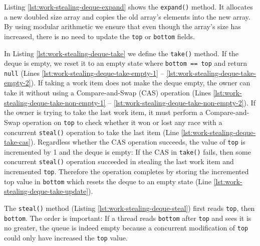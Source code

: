 

Listing \ref{lst:work-stealing-deque-expand} shows the
\lstinline!expand()! method. It allocates a new doubled size array and
copies the old array's elements into the new array. By using modular
arithmetic we ensure that even though the array's size has increased,
there is no need to update the \lstinline!top! or \lstinline!bottom!
fields.



In Listing \ref{lst:work-stealing-deque-take} we define the
\lstinline!take()! method. If the deque is empty, we reset it to an
empty state where \lstinline!bottom == top! and return
\lstinline!null! (Lines \ref{lst:work-stealing-deque-take-empty-1} --
\ref{lst:work-stealing-deque-take-empty-2}). If taking a work item
does not make the deque empty, the owner can take it without using a
Compare-and-Swap (CAS) operation (Lines
\ref{lst:work-stealing-deque-take-non-empty-1} --
\ref{lst:work-stealing-deque-take-non-empty-2}). If the owner is
trying to take the last work item, it must perform a Compare-and-Swap
operation on \lstinline!top! to check whether it won or lost any race
with a concurrent \lstinline!steal()! operation to take the last item
(Line \ref{lst:work-stealing-deque-take-cas}). Regardless whether the
CAS operation succeeds, the value of \lstinline!top! is incremented by
1 and the deque is empty: If the CAS in \lstinline!take()! fails, then
some concurrent \lstinline!steal()!  operation succeeded in stealing
the last work item and incremented \lstinline!top!. Therefore the
operation completes by storing the incremented top value in
\lstinline!bottom! which resets the deque to an empty state (Line
\ref{lst:work-stealing-deque-take-update}).



The \lstinline!steal()! method (Listing
\ref{lst:work-stealing-deque-steal}) first reads \lstinline!top!, then
\lstinline!bottom!. The order is important: If a thread reads
\lstinline!bottom! after \lstinline!top! and sees it is no greater,
the queue is indeed empty because a concurrent modification of
\lstinline!top! could only have increased the \lstinline!top! value.

